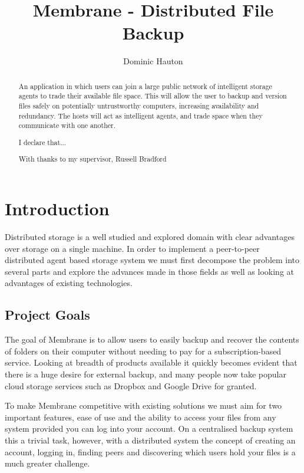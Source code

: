 \documentclass[a4paper, 11pt, twocolumn, twoside]{report}
\title{Membrane - Distributed File Backup}
\author{Dominic Hauton}
\begin{document}
\maketitle


\begin{abstract}
An application in which users can join a large public network of intelligent storage agents to trade their available file space. This will allow the user to backup and version files safely on potentially untrustworthy computers, increasing availability and redundancy. The hosts will act as intelligent agents, and trade space when they communicate with one another.
\end{abstract}

\renewcommand{\abstractname}{Declaration}
\begin{abstract}
\hfil I declare that... \hfil
\end{abstract}

\renewcommand{\abstractname}{Acknowledgements}
\begin{abstract}
\hfil With thanks to my supervisor, Russell Bradford \hfil
\end{abstract}

\tableofcontents

\chapter{Introduction}
Distributed storage is a well studied and explored domain with clear advantages over storage on a single machine. In order to implement a peer-to-peer distributed agent based storage system we must first decompose the problem into several parts and explore the advances made in those fields as well as looking at advantages of existing technologies.

\section{Project Goals}

The goal of Membrane is to allow users to easily backup and recover the contents of folders on their computer without needing to pay for a subscription-based service. Looking at breadth of products available it quickly becomes evident that there is a huge desire for external backup, and many people now take popular cloud storage services such as Dropbox and Google Drive for granted. \citep{dropbox2015popularity}

To make Membrane competitive with existing solutions we must aim for two important features, ease of use and the ability to access your files from any system provided you can log into your account. On a centralised backup system this a trivial task, however, with a distributed system the concept of creating an account, logging in, finding peers and discovering which users hold your files is a much greater challenge.
\end{document}
